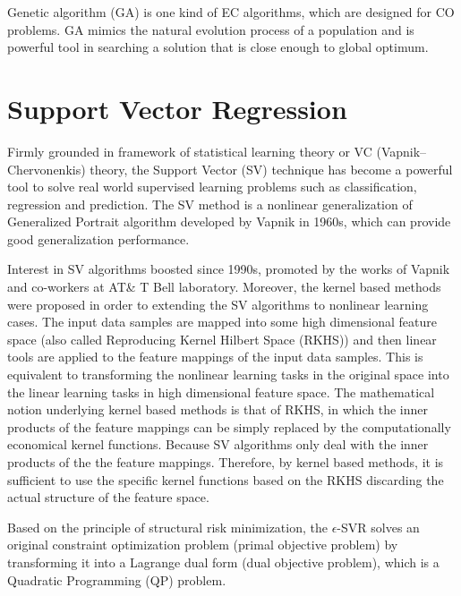  Genetic algorithm (GA) is one kind of EC algorithms, which are designed for CO problems. GA mimics the natural evolution process of a population and is powerful tool in searching a solution that is close enough to global optimum\cite{Goldberg:1989:GAS:534133}.
 
 \section{Support Vector Regression}
 
 Firmly grounded in framework of statistical learning theory or VC (Vapnik--Chervonenkis) theory, the Support Vector (SV) technique has become a powerful tool to solve real world supervised learning problems such as classification, regression and prediction. The SV method is a nonlinear generalization of Generalized Portrait algorithm developed by Vapnik in 1960s\cite{vapnik1963pattern}\cite{vapnik1964note}, which can provide good generalization performance\cite{scholkopf2002learning}.

Interest in SV algorithms boosted since 1990s, promoted by the works of Vapnik and co-workers at AT\& T Bell laboratory\cite{boser1992training}\cite{guyon1993automatic}\cite{vapnik2013nature}\cite{cortes1995support}\cite{scholkopf1996incorporating}\cite{vapnik1996support}.
Moreover, the kernel based methods\cite{scholkopf2002learning} were proposed in order to extending the SV algorithms to nonlinear learning cases. The input data samples are mapped into some high dimensional feature space (also called Reproducing Kernel Hilbert Space (RKHS)) and then linear tools are applied to the feature mappings of the input data samples. This is equivalent to transforming the nonlinear learning tasks in the original space into the linear learning tasks in high dimensional feature space. The mathematical notion underlying kernel based methods is that of RKHS\cite{scholkopf2002learning}, in which the inner products of the feature mappings can be simply replaced by the computationally economical kernel functions. Because SV algorithms only deal with the inner products of the the feature mappings. Therefore, by kernel based methods, it is sufficient to use the specific kernel functions based on the RKHS discarding the actual structure of the feature space.   
 
Based on the principle of structural risk minimization\cite{vapnik1982estimation}, the $\epsilon$-SVR\cite{vapnik2013nature}\cite{smola2004tutorial} solves an original constraint optimization problem (primal objective problem) by transforming it into a Lagrange dual form (dual objective problem), which is a Quadratic Programming (QP) problem. 


